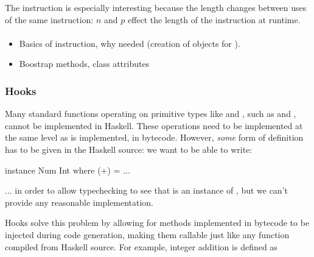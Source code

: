 \documentclass[dissertation.tex]{subfiles}
\begin{document}
{{{{                The  instruction is especially interesting because the length changes between
                uses of the same instruction: \(n\) and \(p\) effect the length of the instruction at runtime.
            
            }
            \paragraph*{}
            {

                \begin{itemize}
                \item
                {
                    Basics of instruction, why needed (creation of  objects for
                    ).
                }
                \item Boostrap methods, class attributes
                \end{itemize}
            }
        }
        \subsubsection{Hooks}
        {

            Many standard functions operating on primitive types like  and , such as
            \haskell{(+)} and \haskell{(==)}, cannot be implemented in Haskell. These operations need to be implemented
            at the same level as  is implemented, in bytecode. However, \textit{some} form of definition
            has to be given in the Haskell source: we want to be able to write:

            \begin{haskellfigure}
            instance Num Int where
                (+) = ...
            \end{haskellfigure}

            ... in order to allow typechecking to see that  is an instance of , but we can't
            provide any reasonable implementation.

            Hooks solve this problem by allowing for methods implemented in bytecode to be injected during code
            generation, making them callable just like any function compiled from Haskell source. For example, integer
            addition is defined as 

}}}
\end{document}
